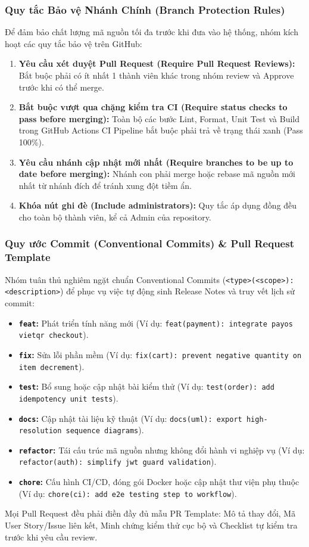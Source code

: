 \documentclass[11pt,a4paper]{article}
\begin{document}
\subsubsection{Quy tắc Bảo vệ Nhánh Chính (Branch Protection Rules)}
Để đảm bảo chất lượng mã nguồn tối đa trước khi đưa vào hệ thống, nhóm kích hoạt các quy tắc bảo vệ trên GitHub:
\begin{enumerate}[leftmargin=*]
    \item \textbf{Yêu cầu xét duyệt Pull Request (Require Pull Request Reviews):} Bắt buộc phải có ít nhất 1 thành viên khác trong nhóm review và Approve trước khi có thể merge.
    \item \textbf{Bắt buộc vượt qua chặng kiểm tra CI (Require status checks to pass before merging):} Toàn bộ các bước Lint, Format, Unit Test và Build trong GitHub Actions CI Pipeline bắt buộc phải trả về trạng thái xanh (Pass 100\%).
    \item \textbf{Yêu cầu nhánh cập nhật mới nhất (Require branches to be up to date before merging):} Nhánh con phải merge hoặc rebase mã nguồn mới nhất từ nhánh đích để tránh xung đột tiềm ẩn.
    \item \textbf{Khóa nút ghi đè (Include administrators):} Quy tắc áp dụng đồng đều cho toàn bộ thành viên, kể cả Admin của repository.
\end{enumerate}
\clearpage

\subsubsection{Quy ước Commit (Conventional Commits) \& Pull Request Template}
Nhóm tuân thủ nghiêm ngặt chuẩn Conventional Commits (\texttt{<type>(<scope>): <description>}) để phục vụ việc tự động sinh Release Notes và truy vết lịch sử commit:
\begin{itemize}[leftmargin=*]
    \item \textbf{\texttt{feat}:} Phát triển tính năng mới (Ví dụ: \texttt{feat(payment): integrate payos vietqr checkout}).
    \item \textbf{\texttt{fix}:} Sửa lỗi phần mềm (Ví dụ: \texttt{fix(cart): prevent negative quantity on item decrement}).
    \item \textbf{\texttt{test}:} Bổ sung hoặc cập nhật bài kiểm thử (Ví dụ: \texttt{test(order): add idempotency unit tests}).
    \item \textbf{\texttt{docs}:} Cập nhật tài liệu kỹ thuật (Ví dụ: \texttt{docs(uml): export high-resolution sequence diagrams}).
    \item \textbf{\texttt{refactor}:} Tái cấu trúc mã nguồn nhưng không đổi hành vi nghiệp vụ (Ví dụ: \texttt{refactor(auth): simplify jwt guard validation}).
    \item \textbf{\texttt{chore}:} Cấu hình CI/CD, đóng gói Docker hoặc cập nhật thư viện phụ thuộc (Ví dụ: \texttt{chore(ci): add e2e testing step to workflow}).
\end{itemize}
Mọi Pull Request đều phải điền đầy đủ mẫu PR Template: Mô tả thay đổi, Mã User Story/Issue liên kết, Minh chứng kiểm thử cục bộ và Checklist tự kiểm tra trước khi yêu cầu review.
\clearpage
\end{document}
